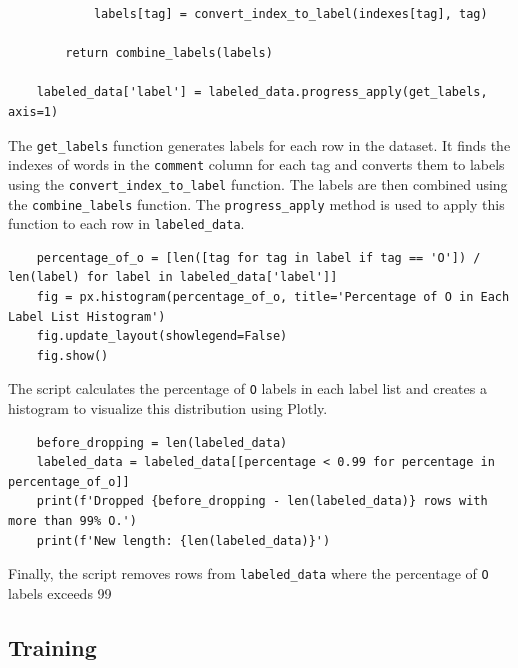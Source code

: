 \documentclass{solutionclass} %
\begin{document}
\begin{solution}
\begin{lstlisting}
            labels[tag] = convert_index_to_label(indexes[tag], tag)
    
        return combine_labels(labels)
    
    labeled_data['label'] = labeled_data.progress_apply(get_labels, axis=1)
    \end{lstlisting}
    
    The \texttt{get\_labels} function generates labels for each row in the dataset. It finds the indexes of words in the \texttt{comment} column for each tag and converts them to labels using the \texttt{convert\_index\_to\_label} function. The labels are then combined using the \texttt{combine\_labels} function. The \texttt{progress\_apply} method is used to apply this function to each row in \texttt{labeled\_data}.
    
    \begin{lstlisting}
    percentage_of_o = [len([tag for tag in label if tag == 'O']) / len(label) for label in labeled_data['label']]
    fig = px.histogram(percentage_of_o, title='Percentage of O in Each Label List Histogram')
    fig.update_layout(showlegend=False)
    fig.show()
    \end{lstlisting}
    
    The script calculates the percentage of \texttt{O} labels in each label list and creates a histogram to visualize this distribution using Plotly.
    
    \begin{lstlisting}
    before_dropping = len(labeled_data)
    labeled_data = labeled_data[[percentage < 0.99 for percentage in percentage_of_o]]
    print(f'Dropped {before_dropping - len(labeled_data)} rows with more than 99% O.')
    print(f'New length: {len(labeled_data)}')
    \end{lstlisting}
    
    Finally, the script removes rows from \texttt{labeled\_data} where the percentage of \texttt{O} labels exceeds 99%
    
\end{solution}




\subsection*{Training}
\end{document}
